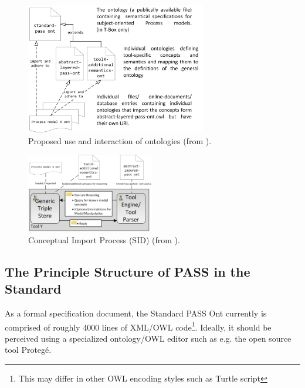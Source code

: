 
\begin{figure}[ht]
	\centering
	\includegraphics[width=0.7\textwidth]{Figures/Ontology/Introduction/ont-and-models.png}
	\caption{Proposed use and interaction of ontologies (from \cite{elster:ont} ).}
	\label{fig:ontAndModel}
\end{figure}

\begin{figure}[ht]
	\centering
	\includegraphics[width=0.50\textwidth]{Figures/Ontology/Introduction/importWorkflow.png}
	\caption{Conceptual Import Process (SID) (from \cite{elster:ont}). }
	\label{fig:ImportOnt}
\end{figure}



\subsection{The Principle Structure of PASS in the Standard }

As a formal specification document, the Standard PASS Ont currently is comprised of roughly 4000 lines of XML/OWL code\footnote{This may differ in other OWL encoding styles such as Turtle script}. Ideally, it should be perceived using a specialized ontology/OWL editor such as e.g. the open source tool Protegé. 

